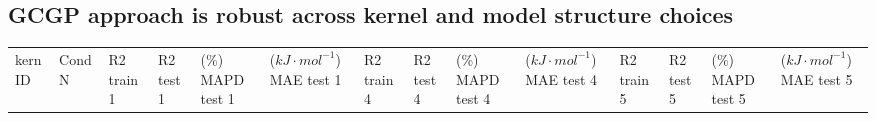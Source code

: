 \documentclass[journal=jacsat,manuscript=article]{achemso}
\begin{document}
\subsection{GCGP approach is robust across kernel and model structure choices} 
\label{sec:kern_sweep}

\begin{table}[H]
    \centering
    \begin{tabular}{>{\centering\arraybackslash}p{1.0cm}>{\centering\arraybackslash}p{1.0cm}>{\centering\arraybackslash}p{0.75cm}>{\centering\arraybackslash}p{0.75cm}>{\centering\arraybackslash}p{1.0cm}>{\centering\arraybackslash}p{1.0cm}>{\centering\arraybackslash}p{0.75cm}>{\centering\arraybackslash}p{0.75cm}>{\centering\arraybackslash}p{1cm}>{\centering\arraybackslash}p{0.75cm}>{\centering\arraybackslash}p{0.75cm}>{\centering\arraybackslash}p{0.75cm}>{\centering\arraybackslash}p{1cm}>{\centering\arraybackslash}p{0.75cm}}
       \vspace{1.15cm}  kern ID& 
       \vspace{1.15cm} Cond   N& 
       \vspace{0.66cm} R2  train     1&  
 \vspace{0.66cm} R2  test   1& 
 \vspace{0.146cm} (\%) MAPD test \hspace{0.5cm}  1&  
 ($kJ \cdot mol^{-1}$) MAE test  \hspace{0.5cm}   1&  \vspace{0.66cm} R2 train   4& 
 \vspace{0.66cm} R2 test   4& 
 \vspace{0.146cm} (\%) MAPD test  \hspace{0.5cm}  4&  
 ($kJ \cdot mol^{-1}$) MAE test  \hspace{0.5cm}   4& \vspace{0.66cm} R2   train      5& 
 \vspace{0.66cm} R2   test     5& 
 \vspace{0.146cm} (\%) MAPD test  \hspace{0.5cm}   5&
 ($kJ \cdot mol^{-1}$) MAE test  \hspace{0.5cm}   5
 


\end{tabular}
\end{table}
\end{document}
